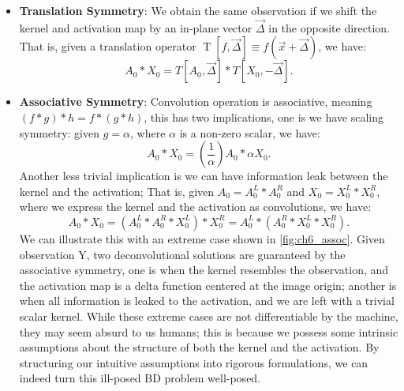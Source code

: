 \begin{itemize}
	\item \textbf{Translation Symmetry}: We obtain the same observation if we shift the kernel and activation map by an in-plane vector $\vec{\Delta}$ in the opposite direction. That is, given a translation operator $\operatorname{T}[f,\vec{\Delta}] \equiv f(\vec{x}+\vec{\Delta})$, we have:  
	\begin{equation}
		A_0 * X_0 = T[A_0,\vec{\Delta}] * T[X_0, -\vec{\Delta}].
	\end{equation}
	\item \textbf{Associative Symmetry}: Convolution operation is associative, meaning $(f * g) * h = f * (g *h)$, this has two implications, one is we have scaling symmetry: given $g = \alpha$, where $\alpha$ is a non-zero scalar, we have: 
	\begin{equation}
		A_0 * X_0 = (\frac{1}{\alpha})A_0*\alpha X_0.
	\end{equation}
	Another less trivial implication is we can have information leak between the kernel and the activation; That is, given $A_0 = A_0^L * A_0^R$ and $X_0= X_0^L * X_0^R$, where we express the kernel and the activation as convolutions, we have: 
	\begin{equation}
		A_0 * X_0 = (A_0^L * A_0^R * X_0^L) * X_0^R = A_0^L * (A_0^R * X_0^L * X_0^R).
	\end{equation}
	We can illustrate this with an extreme case shown in \ref{fig:ch6_assoc}. Given observation Y, two deconvolutional solutions are guaranteed by the associative symmetry, one is when the kernel resembles the observation, and the activation map is a delta function centered at the image origin; another is when all information is leaked to the activation, and we are left with a trivial scalar kernel. While these extreme cases are not differentiable by the machine, they may seem absurd to us humans; this is because we possess some intrinsic assumptions about the structure of both the kernel and the activation. By structuring our intuitive assumptions into rigorous formulations, we can indeed turn this ill-posed \ac{BD} problem well-posed. 
	
\end{itemize}



